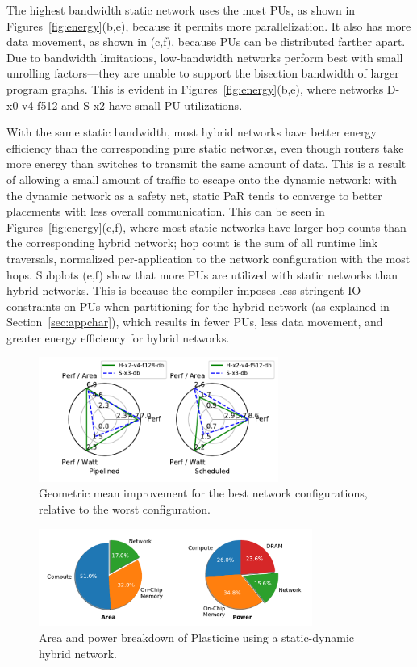 The highest bandwidth static network uses the most PUs, as shown in Figures~\ref{fig:energy}(b,e), because it permits more parallelization. 
It also has more data movement, as shown in (c,f), because PUs can be distributed farther apart. 
Due to bandwidth limitations, low-bandwidth networks perform best with small unrolling factors---they are unable to support the bisection bandwidth of larger program graphs.
This is evident in Figures~\ref{fig:energy}(b,e), where networks D-x0-v4-f512 and S-x2 have small PU utilizations.

With the same static bandwidth, most hybrid networks have better energy efficiency than the corresponding pure static networks, even though routers take more energy than switches to transmit the same amount of data.
This is a result of allowing a small amount of traffic to escape onto the dynamic network: with the dynamic network as a safety net, static PaR tends to converge to better placements with less overall communication.
This can be seen in Figures~\ref{fig:energy}(c,f), where most static networks have larger hop counts than the corresponding hybrid network; hop count is the sum of all runtime link traversals, normalized per-application to the network configuration with the most hops.
Subplots (e,f) show that more PUs are utilized with static networks than hybrid networks.
This is because the compiler imposes less stringent IO constraints on PUs when partitioning for the
hybrid network (as explained in Section~\ref{sec:appchar}), which results in fewer PUs, less data movement, and greater energy efficiency for hybrid networks.

\begin{figure}
  \centering
\includegraphics[width=0.7\textwidth]{network/figs/radar_best.pdf}
  \caption[Best newtork configurations]{Geometric mean improvement for the best network configurations, relative to the worst configuration.}\label{fig:radar_best}
\end{figure}
\begin{figure}
\centering
\includegraphics[width=0.8\textwidth]{figs/pie.pdf}
\caption[Area and power breakdown of Plasticine]{
  Area and power breakdown of Plasticine using a static-dynamic hybrid network.
}
\label{fig:breakdown}
\end{figure}

